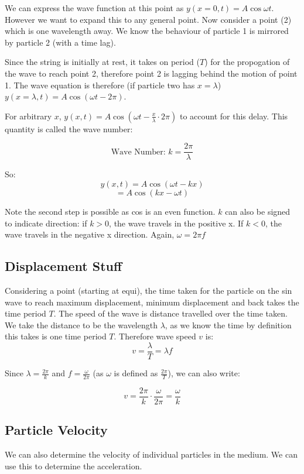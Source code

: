 We can express the wave function at this point as $y(x = 0, t) = A \cos \omega t$. However we want to expand this to any general point. Now consider a point (2) which is one wavelength away. We know the behaviour of particle 1 is mirrored by particle 2 (with a time lag).

Since the string is initially at rest, it takes on period ($T$) for the propogation of the wave to reach point 2, therefore point 2 is lagging behind the motion of point 1. The wave equation is therefore (if particle two has $x = \lambda$) $y(x = \lambda, t) = A \cos (\omega t - 2\pi)$. 

For arbitrary $x$, $y(x, t) = A \cos(\omega t - \frac{x}{\lambda}\cdot 2 \pi)$ to account for this delay. This quantity is called the wave number:

\[
    \text{Wave Number: } k = \frac{2 \pi}{\lambda}
\]

So:
\[
    y(x,t) = A \cos(\omega t - k x)
\]
\[
    = A \cos(kx - \omega t)
\]

Note the second step is possible as cos is an even function. $k$ can also be signed to indicate direction: if $k > 0$, the wave travels in the positive x. If $k < 0$, the wave travels in the negative x direction. Again, $\omega = 2 \pi f$

\subsection*{Displacement Stuff}
Considering a point (starting at equi), the time taken for the particle on the sin wave to reach maximum displacement, minimum displacement and back takes the time period $T$. The speed of the wave is distance travelled over the time taken. We take the distance to be the wavelength $\lambda$, as we know the time by definition this takes is one time period $T$. Therefore wave speed $v$ is:
\[
    v = \frac{\lambda}{T} = \lambda f
\]

Since $\lambda = \frac{2 \pi}{k}$ and $f = \frac{\omega}{2 \pi}$ (as $\omega$ is defined as $\frac{2 \pi}{T}$), we can also write:

\[
    v = \frac{2 \pi}{k} \cdot \frac{\omega}{2 \pi} = \frac{\omega}{k}
\]

\subsection*{Particle Velocity}
We can also determine the velocity of individual particles in the medium. We can use this to determine the acceleration.

